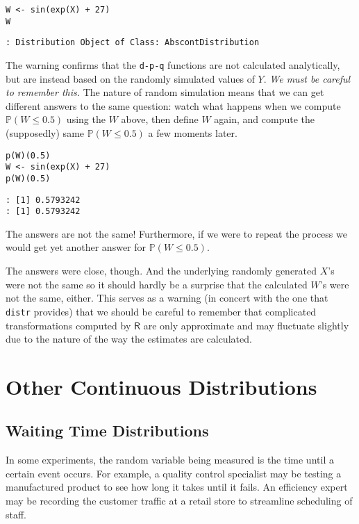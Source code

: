 \begin{verbatim}
W <- sin(exp(X) + 27)
W
\end{verbatim}

\begin{verbatim}
: Distribution Object of Class: AbscontDistribution
\end{verbatim}

The warning confirms that the \texttt{d-p-q} functions are not calculated
analytically, but are instead based on the randomly simulated values
of \(Y\). \emph{We must be careful to remember this.} The nature of random
simulation means that we can get different answers to the same
question: watch what happens when we compute \(\mathbb{P}(W\leq0.5)\)
using the \(W\) above, then define \(W\) again, and compute the
(supposedly) same \(\mathbb{P}(W\leq0.5)\) a few moments later.

\begin{verbatim}
p(W)(0.5)
W <- sin(exp(X) + 27)
p(W)(0.5)
\end{verbatim}

\begin{verbatim}
: [1] 0.5793242
: [1] 0.5793242
\end{verbatim}

The answers are not the same! Furthermore, if we were to repeat the
process we would get yet another answer for \(\mathbb{P}(W\leq0.5)\).

The answers were close, though. And the underlying randomly generated
\(X\)'s were not the same so it should hardly be a surprise that the
calculated \(W\)'s were not the same, either. This serves as a warning
(in concert with the one that \texttt{distr} provides) that we should be
careful to remember that complicated transformations computed by
\(\mathsf{R}\) are only approximate and may fluctuate slightly due to
the nature of the way the estimates are calculated.

\section{Other Continuous Distributions}
\label{sec-6-5}

\subsection{Waiting Time Distributions}
\label{sec-6-5-1}

In some experiments, the random variable being measured is the time
until a certain event occurs. For example, a quality control
specialist may be testing a manufactured product to see how long it
takes until it fails. An efficiency expert may be recording the
customer traffic at a retail store to streamline scheduling of staff.

